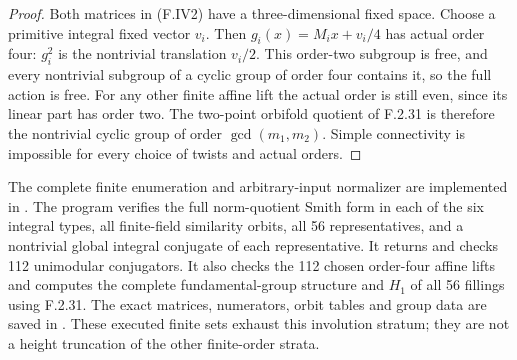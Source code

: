 \begin{proof}
Both matrices in (F.IV2) have a three-dimensional fixed
space.  Choose a primitive integral fixed vector $v_i$.
Then $g_i(x)=M_ix+v_i/4$ has actual order four:
$g_i^2$ is the nontrivial translation $v_i/2$.
This order-two subgroup is free, and every nontrivial
subgroup of a cyclic group of order four contains it, so
the full action is free.  For any other finite affine lift
the actual order is still even, since its linear part has
order two.  The two-point orbifold quotient of F.2.31 is
therefore the nontrivial cyclic group of order
$\gcd(m_1,m_2)$.  Simple connectivity is impossible for
every choice of twists and actual orders.
\end{proof}

The complete finite enumeration and arbitrary-input
normalizer are implemented in
.
The program verifies the full norm-quotient Smith form in
each of the six integral types, all finite-field similarity
orbits, all 56 representatives, and a nontrivial global
integral conjugate of each representative.  It returns and
checks 112 unimodular conjugators.  It also checks the 112
chosen order-four affine lifts and computes the complete
fundamental-group structure and $H_1$ of all 56 fillings
using F.2.31.  The exact matrices, numerators, orbit tables
and group data are saved in
.
These executed finite sets exhaust this involution stratum;
they are not a height truncation of the other finite-order
strata.
